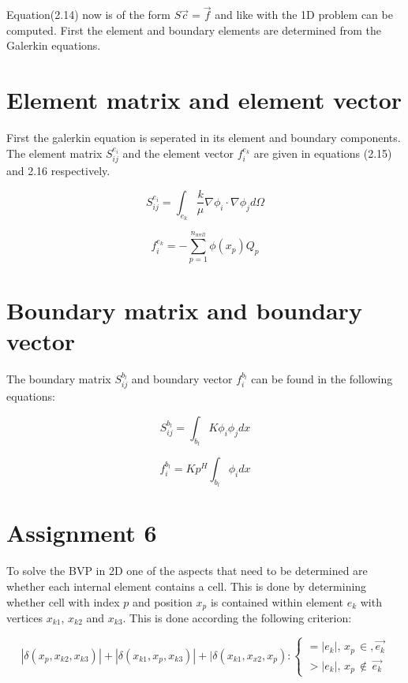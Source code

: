 \documentclass{report}
\begin{document}
Equation(2.14) now is of the form $S\vec{c}=\vec{f}$ and like with the 1D problem can be computed. First the element and boundary elements are determined from the Galerkin equations.


\section{Element matrix and element vector}

First the galerkin equation is seperated in its element and boundary components. The element matrix $S^{e_i}_{ij}$ and the element vector $f^{e_k}_i$ are given in equations (2.15) and 2.16 respectively.

\begin{equation}
	S^{e_i}_{ij} = \int_{e_k}\frac{k}{\mu}\nabla\phi_i\cdot\nabla \phi_j d\Omega
\end{equation}

\begin{equation}
	f^{e_k}_i =  -\sum_{p=1}^{n_{well}}\phi(x_p) Q_p
\end{equation}


\section{Boundary matrix and boundary vector}

The boundary matrix $S^{b_l}_{ij}$ and boundary vector $f^{b_l}_i$ can be found in the following equations:

\begin{equation}
	S^{b_l}_{ij} = \int_{b_l} K\phi_i \phi_j dx
\end{equation}

\begin{equation}
	f^{b_l}_i = Kp^H\int_{b_l}\phi_i dx
\end{equation}


\section{Assignment 6}

To solve the BVP in 2D one of the aspects that need to be determined are whether each internal element contains a cell. This is done by determining whether cell with index $p$ and position $x_p$ is contained within element $e_k$ with vertices $x_{k1}$, $x_{k2}$ and $x_{k3}$. This is done according the following criterion:

\begin{equation}
|\delta(x_p,x_{k2},x_{k3})|+|\delta(x_{k1},x_p,x_{k3})|+|\delta(x_{k1},x_{x2},x_p):
	\begin{cases} 
	=|e_k|,\, x_p\, \in, \vec{e_k}\\ 
	>|e_k|,\, x_p\, \notin\,\vec{e_k}
	\end{cases} 
\end{equation}
\end{document}
